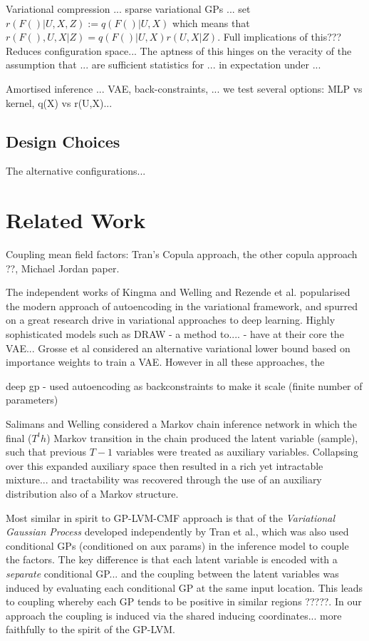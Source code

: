\documentclass{article}
\begin{document}
Variational compression ... sparse variational GPs ... set $r(F()|U,X,Z):=q(F()|U,X)$ which means that $r(F(),U,X|Z) = q(F()|U,X)r(U,X|Z)$. Full implications of this??? Reduces configuration space... The aptness of this hinges on the veracity of the assumption that ... are sufficient statistics for ... in expectation under ...

Amortised inference ... VAE, back-constraints, ... we test several options: MLP vs kernel, q(X) vs r(U,X)...

\subsection{Design Choices}
\label{subsec:choices}

The alternative configurations...

\section{Related Work}
\label{sec:related}

Coupling mean field factors: Tran's Copula approach, the other copula approach ??, Michael Jordan paper.

The independent works of Kingma and Welling and Rezende et al. popularised the modern approach of autoencoding in the variational framework, and spurred on a great research drive in variational approaches to deep learning. Highly sophisticated models such as DRAW - a method to.... - have at their core the VAE... Grosse et al considered an alternative variational lower bound based on importance weights to train a VAE. However in all these approaches, the

deep gp - used autoencoding as backconstraints to make it scale (finite number of parameters)

Salimans and Welling considered a Markov chain inference network in which the final ($T^th$) Markov transition in the chain produced the latent variable (sample), such that previous $T-1$ variables were treated as auxiliary variables. Collapsing over this expanded auxiliary space then resulted in a rich yet intractable mixture... and tractability was recovered through the use of an auxiliary distribution also of a Markov structure.

Most similar in spirit to GP-LVM-CMF approach is that of the \emph{Variational Gaussian Process} developed independently by Tran et al., which was also used conditional GPs (conditioned on aux params) in the inference model to couple the factors. The key difference is that each latent variable is encoded with a \emph{separate} conditional GP... and the coupling between the latent variables was induced by evaluating each conditional GP at the same input location. This leads to coupling whereby each GP tends to be positive in similar regions ?????. In our approach the coupling is induced via the shared inducing coordinates... more faithfully to the spirit of the GP-LVM.
\end{document}
